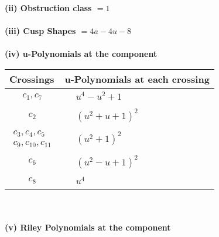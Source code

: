\documentclass[1p]{elsarticle_modified}
\theoremstyle{definition}
\begin{document}
\flushleft \textbf{(ii) Obstruction class $= 1$}\\~\\
\flushleft \textbf{(iii) Cusp Shapes $= 4 a-4 u-8$}\\~\\
\newpage\renewcommand{\arraystretch}{1}
\flushleft \textbf{(iv) u-Polynomials at the component}\newline \\
\begin{tabular}{m{50pt}|m{274pt}}
Crossings & \hspace{64pt}u-Polynomials at each crossing \\
\hline $$\begin{aligned}c_{1},c_{7}\end{aligned}$$&$\begin{aligned}
&u^4- u^2+1
\end{aligned}$\\
\hline $$\begin{aligned}c_{2}\end{aligned}$$&$\begin{aligned}
&(u^2+u+1)^2
\end{aligned}$\\
\hline $$\begin{aligned}c_{3},c_{4},c_{5}\\c_{9},c_{10},c_{11}\end{aligned}$$&$\begin{aligned}
&(u^2+1)^2
\end{aligned}$\\
\hline $$\begin{aligned}c_{6}\end{aligned}$$&$\begin{aligned}
&(u^2- u+1)^2
\end{aligned}$\\
\hline $$\begin{aligned}c_{8}\end{aligned}$$&$\begin{aligned}
&u^4
\end{aligned}$\\
\hline
\end{tabular}\\~\\
\newpage\renewcommand{\arraystretch}{1}
\flushleft \textbf{(v) Riley Polynomials at the component}\newline \\
\end{document}
